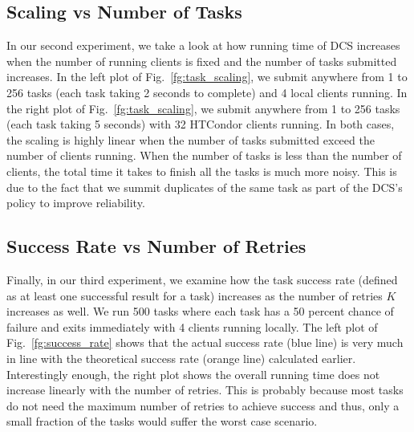 \documentclass{article}
\begin{document}
\subsection{Scaling vs Number of Tasks}

In our second experiment, we take a look at how running time of DCS increases when the number of running clients is fixed and the number of tasks submitted increases. In the left plot of Fig.~\ref{fg:task_scaling}, we submit anywhere from 1 to 256 tasks (each task taking 2 seconds to complete) and 4 local clients running. In the right plot of Fig.~\ref{fg:task_scaling}, we submit anywhere from 1 to 256 tasks (each task taking 5 seconds) with 32 HTCondor clients running. In both cases, the scaling is highly linear when the number of tasks submitted exceed the number of clients running. When the number of tasks is less than the number of clients, the total time it takes to finish all the tasks is much more noisy. This is due to the fact that we summit duplicates of the same task as part of the DCS's policy to improve reliability.

\subsection{Success Rate vs Number of Retries}

Finally, in our third experiment, we examine how the task success rate (defined as at least one successful result for a task) increases as the number of retries $K$ increases as well. We run 500 tasks where each task has a 50 percent chance of failure and exits immediately with 4 clients running locally. The left plot of Fig.~\ref{fg:success_rate} shows that the actual success rate (blue line) is very much in line with the theoretical success rate (orange line) calculated earlier. Interestingly enough, the right plot shows the overall running time does not increase linearly with the number of retries. This is probably because most tasks do not need the maximum number of retries to achieve success and thus, only a small fraction of the tasks would suffer the worst case scenario.
\end{document}
